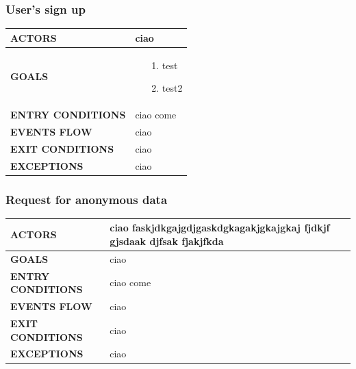 \documentclass[a4paper]{article}
\begin{document}
\subsubsection{User's sign up}
\begin{center}
    \begin{tabular}{ l || p{6cm} ||}
        \bf{ACTORS} & ciao \\ 
        \hline
        \bf{GOALS} & \begin{itemize}[noitemsep, topsep=0cm, leftmargin=*] \vspace{-0.2cm}
            \item[1.] test
            \item[2.] test2
        \end{itemize} \\
        \hline
        \bf{ENTRY CONDITIONS} & ciao come  \\ 
        \hline
        \bf{EVENTS FLOW} & ciao\\ 
        \hline
        \bf{EXIT CONDITIONS} & ciao\\ \hline
        \bf{EXCEPTIONS} & ciao\\ \hline \hline
    \end{tabular}
\end{center}

\vspace{1cm}

\subsubsection{Request for anonymous data}
\begin{center}
    \begin{tabular}{l || p{6cm} ||}
        \bf{ACTORS} & ciao faskjdkgajgdjgaskdgkagakjgkajgkaj fjdkjf gjsdaak djfsak fjakjfkda \\ \hline
        \bf{GOALS} & ciao \\ \hline
        \bf{ENTRY CONDITIONS} & ciao come  \\ \hline
        \bf{EVENTS FLOW} & ciao\\ \hline
        \bf{EXIT CONDITIONS} & ciao\\ \hline
        \bf{EXCEPTIONS} & ciao\\ \hline \hline
    \end{tabular}
\end{center}

\vspace{1cm}
\end{document}

